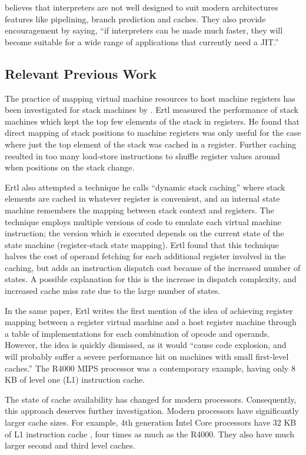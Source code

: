 		\cite{fastjava} believes that interpreters are not well designed to suit modern architectures features like pipelining, branch prediction and caches. They also provide encouragement by saying, ``if interpreters can be made much faster, they will become suitable for a wide range of applications that currently need a JIT.''
		
		\subsection{Relevant Previous Work}
		The practice of mapping virtual machine resources to host machine registers has been investigated for stack machines by \cite{stackcaching}. Ertl measured the performance of stack machines which kept the top few elements of the stack in registers. He found that direct mapping of stack positions to machine registers was only useful for the case where just the top element of the stack was cached in a register. Further caching resulted in too many load-store instructions to shuffle register values around when positions on the stack change.
		
		Ertl also attempted a technique he calls ``dynamic stack caching'' where stack elements are cached in whatever register is convenient, and an internal state machine remembers the mapping between stack context and registers. The technique employs multiple versions of code to emulate each virtual machine instruction; the version which is executed depends on the current state of the state machine (register-stack state mapping). Ertl found that this technique halves the cost of operand fetching for each additional register involved in the caching, but adds an instruction dispatch cost because of the increased number of states. A possible explanation for this is the increase in dispatch complexity, and increased cache miss rate due to the large number of states.
		
		In the same paper, Ertl writes the first mention of the idea of achieving register mapping between a register virtual machine and a host register machine through a table of implementations for each combination of opcode and operands. However, the idea is quickly dismissed, as it would ``cause code explosion, and will probably suffer a severe performance hit on machines with small first-level caches.'' The R4000 MIPS processor was a contemporary example, having only 8 KB of level one (L1) instruction cache.
	
		The state of cache availability has changed for modern processors. Consequently, this approach deserves further investigation. Modern processors have significantly larger cache sizes. For example, 4th generation Intel Core processors have 32 KB of L1 instruction cache \citep{optimisationreference}, four times as much as the R4000. They also have much larger second and third level caches.
		
